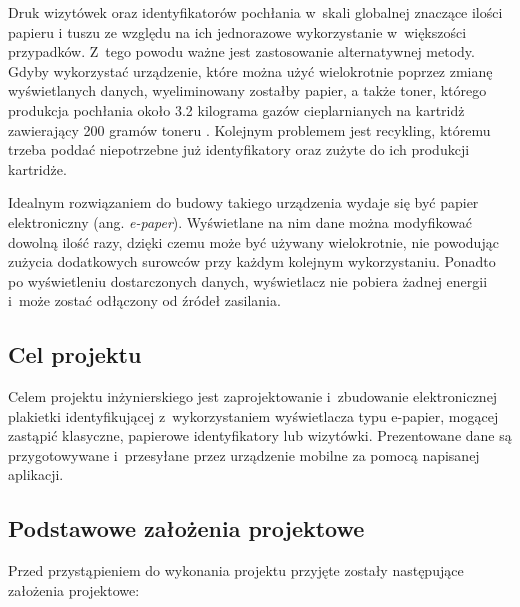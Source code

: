 \documentclass[a4paper,12pt, twoside]{article}
\begin{document}
    	Druk wizytówek oraz identyfikatorów pochłania w~skali globalnej znaczące ilości papieru i tuszu ze względu na ich jednorazowe wykorzystanie w~większości przypadków. Z~tego powodu ważne jest zastosowanie alternatywnej metody. Gdyby wykorzystać urządzenie, które można użyć wielokrotnie poprzez zmianę wyświetlanych danych, wyeliminowany zostałby papier, a także toner, którego produkcja pochłania około 3.2 kilograma gazów cieplarnianych na kartridż zawierający 200 gramów toneru \cite{cartidge_production}. Kolejnym problemem jest recykling, któremu trzeba poddać niepotrzebne już identyfikatory oraz zużyte do ich produkcji kartridże.
    	
    	Idealnym rozwiązaniem do budowy takiego urządzenia wydaje się być papier elektroniczny (ang. \textit{e-paper}). Wyświetlane na nim dane można modyfikować dowolną ilość razy, dzięki czemu może być używany wielokrotnie, nie powodując zużycia dodatkowych surowców przy każdym kolejnym wykorzystaniu. Ponadto po wyświetleniu dostarczonych danych, wyświetlacz nie pobiera żadnej energii i~może zostać odłączony od źródeł zasilania.

    	\subsection{Cel projektu}
    	Celem projektu inżynierskiego jest zaprojektowanie i~zbudowanie elektronicznej plakietki identyfikującej z~wykorzystaniem wyświetlacza typu e-papier, mogącej zastąpić klasyczne, papierowe identyfikatory lub wizytówki. Prezentowane dane są przygotowywane i~przesyłane przez urządzenie mobilne za pomocą napisanej aplikacji.

    	\subsection{Podstawowe założenia projektowe}
    	Przed przystąpieniem do wykonania projektu przyjęte zostały następujące założenia projektowe:
    	
\end{document}
